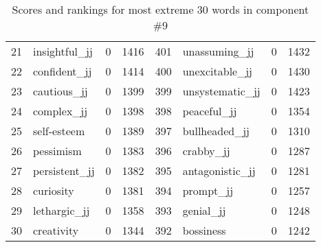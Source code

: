 \begin{table}[tbp]
\begin{tabular}{| rlr@{.}l | rlr@{.}l |}
    21 & insightful\_jj & 0 & 1416    &    401 & unassuming\_jj & 0 & 1432 \\
    22 & confident\_jj & 0 & 1414    &    400 & unexcitable\_jj & 0 & 1430 \\
    23 & cautious\_jj & 0 & 1399    &    399 & unsystematic\_jj & 0 & 1423 \\
    24 & complex\_jj & 0 & 1398    &    398 & peaceful\_jj & 0 & 1354 \\
    25 & self-esteem & 0 & 1389    &    397 & bullheaded\_jj & 0 & 1310 \\
    26 & pessimism & 0 & 1383    &    396 & crabby\_jj & 0 & 1287 \\
    27 & persistent\_jj & 0 & 1382    &    395 & antagonistic\_jj & 0 & 1281 \\
    28 & curiosity & 0 & 1381    &    394 & prompt\_jj & 0 & 1257 \\
    29 & lethargic\_jj & 0 & 1358    &    393 & genial\_jj & 0 & 1248 \\
    30 & creativity & 0 & 1344    &    392 & bossiness & 0 & 1242 \\
    \hline
    \end{tabular}
    \caption{Scores and rankings for most extreme 30 words in component \#9} 
\end{table}
\clearpage
